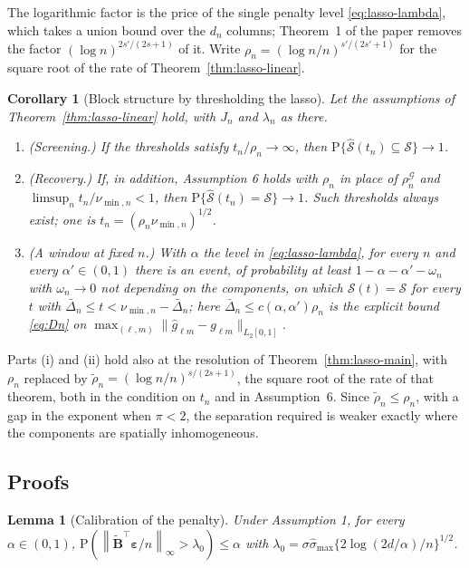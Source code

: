 \documentclass[10pt]{book}
\newtheorem{lemma}{Lemma}[section]
\newtheorem{corollary}{Corollary}[section]
\theoremstyle{definition}
\newcommand{\Prob}{\mathrm{P}}
\newcommand{\T}{^{\top}}
\newcommand{\norm}[1]{\left\lVert #1 \right\rVert}
\newcommand{\cv}{\ell}
\newcommand{\md}{m}
\newcommand{\gcomp}[2]{g_{#1#2}}
\newcommand{\pen}{\lambda}
\newcommand{\penn}{\lambda_{n}}
\newcommand{\seff}{s'}
\newcommand{\Bmat}{\mathbf{B}}
\newcommand{\Btil}{\widetilde{\Bmat}}
\newcommand{\bveps}{\boldsymbol{\varepsilon}}
\newcommand{\smax}{\widehat{\sigma}_{\max}}
\newcommand{\rhoG}{\rho^{\mathcal{G}}_{n}}
\begin{document}
{The logarithmic factor is the price of the single penalty level
\eqref{eq:lasso-lambda}, which takes a union bound over the $d_n$ columns;
Theorem~1 of the paper removes the factor $(\log n)^{2\seff/(2s+1)}$ of it.
Write $\rho_n = (\log n/n)^{\seff/(2\seff+1)}$ for the square root of the rate
of Theorem~\ref{thm:lasso-linear}.

\begin{corollary}[Block structure by thresholding the lasso]
\label{cor:lasso-threshold}
Let the assumptions of Theorem~\ref{thm:lasso-linear} hold, with $J_n$ and
$\penn$ as there.
\begin{enumerate}
\item[(i)] (Screening.) If the thresholds satisfy $t_n/\rho_n \to \infty$,
then $\Prob\{\widehat{\mathcal{S}}(t_n) \subseteq \mathcal{S}\} \to 1$.
\item[(ii)] (Recovery.) If, in addition, Assumption 6 holds with $\rho_n$ in
place of $\rhoG$ and $\limsup_n t_n/\nu_{\min,n} < 1$, then
$\Prob\{\widehat{\mathcal{S}}(t_n) = \mathcal{S}\} \to 1$. Such thresholds
always exist; one is $t_n = (\rho_n\nu_{\min,n})^{1/2}$.
\item[(iii)] (A window at fixed $n$.) With $\alpha$ the level in
\eqref{eq:lasso-lambda}, for every $n$ and every $\alpha' \in (0,1)$ there is
an event, of probability at least $1 - \alpha - \alpha' - \omega_n$ with
$\omega_n \to 0$ not depending on the components, on which
$\widehat{\mathcal{S}}(t) = \mathcal{S}$ for every $t$ with
$\bar{\Delta}_n \le t < \nu_{\min,n} - \bar{\Delta}_n$; here
$\bar{\Delta}_n \le c(\alpha,\alpha')\rho_n$ is the explicit bound
\eqref{eq:Dn} on $\max_{(\cv,\md)}\lVert \widehat{g}_{\cv\md} -
\gcomp{\cv}{\md}\rVert_{L_2[0,1]}$.
\end{enumerate}
\end{corollary}

Parts (i) and (ii) hold also at the resolution of
Theorem~\ref{thm:lasso-main}, with $\rho_n$ replaced by
$\tilde\rho_n = (\log n/n)^{s/(2s+1)}$, the square root of the rate of that
theorem, both in the condition on $t_n$ and in Assumption~6. Since
$\tilde\rho_n \le \rho_n$, with a gap in the exponent when $\pi < 2$, the
separation required is weaker exactly where the components are spatially
inhomogeneous.

\subsection*{Proofs}

\begin{lemma}[Calibration of the penalty]
\label{lem:calib}
Under Assumption 1, for every $\alpha \in (0,1)$,
$\Prob(\norm{\Btil\T\bveps/n}_{\infty} > \pen_0) \le \alpha$ with
$\pen_0 = \sigma\smax\{2\log(2d/\alpha)/n\}^{1/2}$.
\end{lemma}

}
\end{document}
